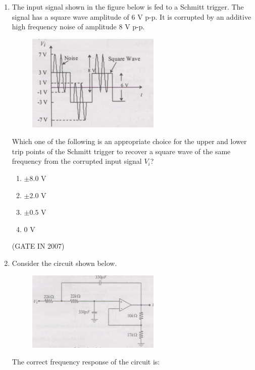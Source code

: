 \documentclass[journal]{IEEEtran}
\begin{document}
\begin{enumerate}
\begin{multicols}{4}
\begin{enumerate}
    \item 0.2 V
    \item 2 V
    \item 7.4 V
    \item 10 V
\end{enumerate}
\end{multicols}
\hfill(GATE IN 2007)
\item The input signal shown in the figure below is fed to a Schmitt trigger. The signal has a square wave amplitude of 6 V p-p. It is corrupted by an additive high frequency noise of amplitude 8 V p-p.
\begin{figure}[H]
    \centering
      \includegraphics[width=0.6\textwidth]{32.jpg} 
      \caption{}
    \label{fig:fig32} 
\end{figure}
Which one of the following is an appropriate choice for the upper and lower trip points of the Schmitt trigger to recover a square wave of the same frequency from the corrupted input signal $V_i$?

\begin{multicols}{4}
\begin{enumerate}
    \item $\pm 8.0$ V
    \item $\pm 2.0$ V
    \item $\pm 0.5$ V
    \item 0 V
\end{enumerate}
\end{multicols}
\hfill(GATE IN 2007)
\item Consider the circuit shown below.
\begin{figure}[H]
    \centering
      \includegraphics[width=0.6\textwidth]{33.jpg} 
      \caption{}
    \label{fig:fig33} 
\end{figure}
The correct frequency response of the circuit is:


\end{enumerate}
\end{document}
